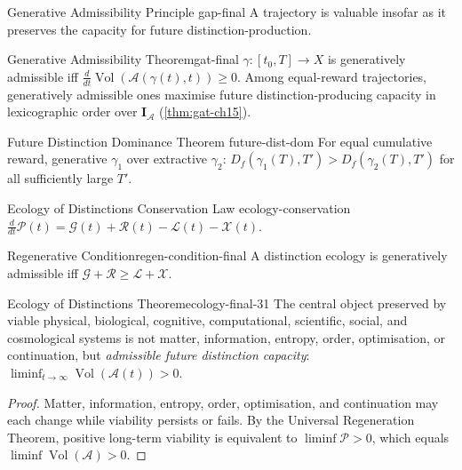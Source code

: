 \documentclass[12pt,twoside,openright]{book}
\newcommand{\adm}{\mathcal{A}}
\newcommand{\Vol}{\operatorname{Vol}}
\begin{document}
\begin{principle}{Generative Admissibility Principle}%
  {gap-final}
  A trajectory is valuable insofar as it preserves the
  capacity for future distinction-production.
\end{principle}

\begin{theorem}{Generative Admissibility Theorem}{gat-final}
  $\gamma:[t_0,T]\to X$ is generatively admissible iff
  $\frac{d}{dt}\Vol(\adm(\gamma(t),t))\ge0$.
  Among equal-reward trajectories, generatively admissible
  ones maximise future distinction-producing capacity in
  lexicographic order over $\mathbf{I}_\adm$
  (\cref{thm:gat-ch15}).
\end{theorem}

\begin{theorem}{Future Distinction Dominance Theorem}%
  {future-dist-dom}
  For equal cumulative reward, generative $\gamma_1$
  over extractive $\gamma_2$:
  $D_f(\gamma_1(T),T')>D_f(\gamma_2(T),T')$
  for all sufficiently large $T'$.
\end{theorem}

\begin{theorem}{Ecology of Distinctions Conservation Law}%
  {ecology-conservation}
  $\frac{d}{dt}\mathcal{P}(t)
  =\mathcal{G}(t)+\mathcal{R}(t)
  -\mathcal{L}(t)-\mathcal{X}(t)$.
\end{theorem}

\begin{corollary}{Regenerative Condition}{regen-condition-final}
  A distinction ecology is generatively admissible iff
  $\mathcal{G}+\mathcal{R}\ge\mathcal{L}+\mathcal{X}$.
\end{corollary}

\begin{theorem}{Ecology of Distinctions Theorem}{ecology-final-31}
  The central object preserved by viable physical,
  biological, cognitive, computational, scientific,
  social, and cosmological systems is not matter,
  information, entropy, order, optimisation, or
  continuation, but \emph{admissible future distinction
  capacity}: $\liminf_{t\to\infty}\Vol(\adm(t))>0$.
\end{theorem}
\begin{proof}
  Matter, information, entropy, order, optimisation,
  and continuation may each change while viability
  persists or fails. By the Universal Regeneration
  Theorem, positive long-term viability is equivalent
  to $\liminf\mathcal{P}>0$, which equals
  $\liminf\Vol(\adm)>0$.
\end{proof}
\end{document}

